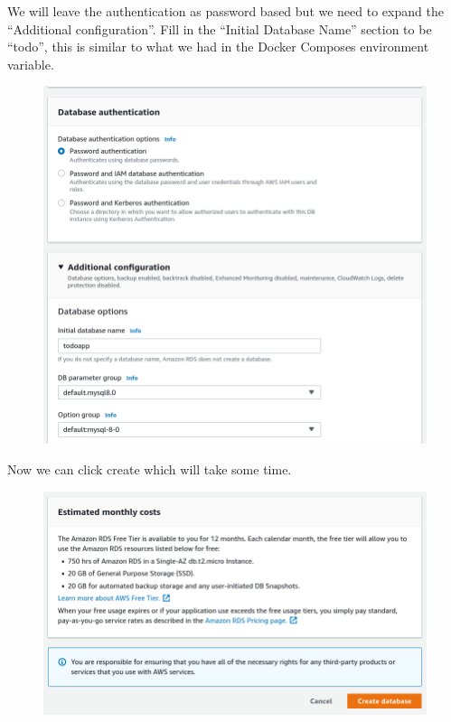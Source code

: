 \documentclass{csse4400}
\begin{document}
We will leave the authentication as password based but we need to expand the ``Additional configuration''. Fill in the ``Initial Database Name'' section to be ``todo'', this is similar to what we had in the Docker Composes environment variable.


\begin{figure}[H]
  \includegraphics[width=\textwidth]{images/db7}
\end{figure}

Now we can click create which will take some time.

\begin{figure}[H]
  \includegraphics[width=\textwidth]{images/db8}
\end{figure}
\end{document}
